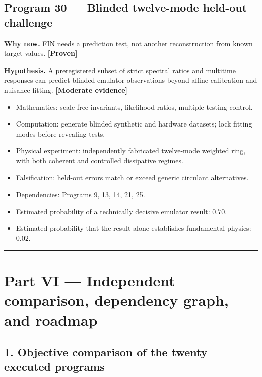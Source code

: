\documentclass[11pt,a4paper,openany]{report}
\newcommand{\statusProven}{\textcolor{fingreen}{[Proven]}}
\newcommand{\statusModerate}{\textcolor{finviolet}{[Moderate evidence]}}
\begin{document}
\section{Program 30 — Blinded twelve-mode held-out challenge}

\textbf{Why now.} FIN needs a prediction test, not another reconstruction from known target values. \textbf{\statusProven{}}

\textbf{Hypothesis.} A preregistered subset of strict spectral ratios and multitime responses can predict blinded emulator observations beyond affine calibration and nuisance fitting. \textbf{\statusModerate{}}

\begin{itemize}
\item 
Mathematics: scale-free invariants, likelihood ratios, multiple-testing control.

\item 
Computation: generate blinded synthetic and hardware datasets; lock fitting modes before revealing tests.

\item 
Physical experiment: independently fabricated twelve-mode weighted ring, with both coherent and controlled dissipative regimes.

\item 
Falsification: held-out errors match or exceed generic circulant alternatives.

\item 
Dependencies: Programs 9, 13, 14, 21, 25.

\item 
Estimated probability of a technically decisive emulator result: \(0.70\).

\item 
Estimated probability that the result alone establishes fundamental physics: \(0.02\).

\end{itemize}

\par\medskip\hrule\medskip

\chapter{Part VI — Independent comparison, dependency graph, and roadmap}

\section{1. Objective comparison of the twenty executed programs}
\end{document}
